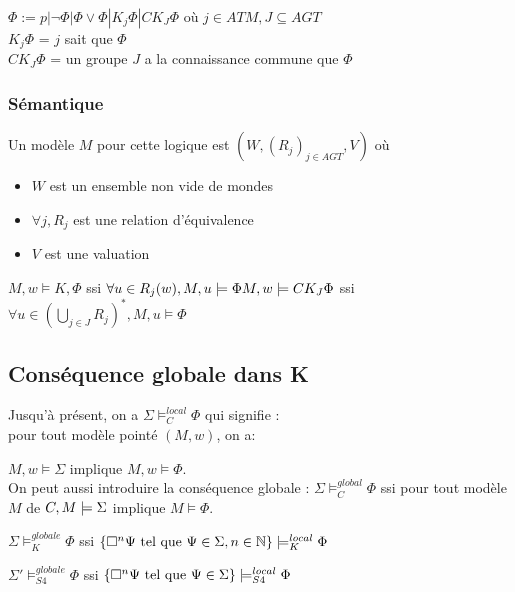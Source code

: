 \documentclass[10pt,a4paper]{article}
\newcommand{\M}{\mathcal{M}}
\newcommand{\ssi}{$ ssi $}
\begin{document}
$\Phi := p | \lnot \Phi | \Phi \vee \Phi | K_j \Phi | CK_J \Phi$	où $j \in ATM, J \subseteq AGT$\\
$K_j \Phi$ = $j$ sait que $\Phi$\\
$CK_J \Phi$ = un groupe $J$ a la connaissance commune que $\Phi$\\

\subsubsection{Sémantique}

\begin{definition}
 
Un modèle $M$ pour cette logique est $(W, (R_j)_{j \in AGT }, V)$ où
\begin{itemize}
 \item $W$ est un ensemble non vide de mondes
 \item $\forall j, R_j$ est une relation d'équivalence
 \item $V$ est une valuation
\end{itemize}

\end{definition}


\begin{definition}
 $M, w \models K, \Phi \ssi \forall u \in R_j(w), M,u \models \Phi\\
 M, w \models CK_J \Phi \ssi \forall u \in (\bigcup_{j \in J} R_j)^*, M, u \models \Phi$
\end{definition}

\subsection{Conséquence globale dans K}

Jusqu'à présent, on a $\Sigma \models_C^{local} \Phi$ qui signifie : \\
pour tout modèle pointé $(M, w)$, on a:

$M, w \models \Sigma$ implique $M, w \models \Phi$.\\

On peut aussi introduire la conséquence globale : $\Sigma \models_C^{global} \Phi$ ssi pour tout modèle $M$ de $C, \\M \models \Sigma$ implique $M \models \Phi.$

\begin{rem}
 $\Sigma \models_K^{globale} \Phi \ssi \{ \Box^n \Psi \tq \Psi \in \Sigma, n \in \Ns \} \models_K^{local} \Phi$

$\Sigma' \models_{S4}^{globale} \Phi \ssi \{ \Box^n \Psi \tq \Psi \in \Sigma \} \models_{S4}^{local} \Phi$
\end{rem}
\end{document}
